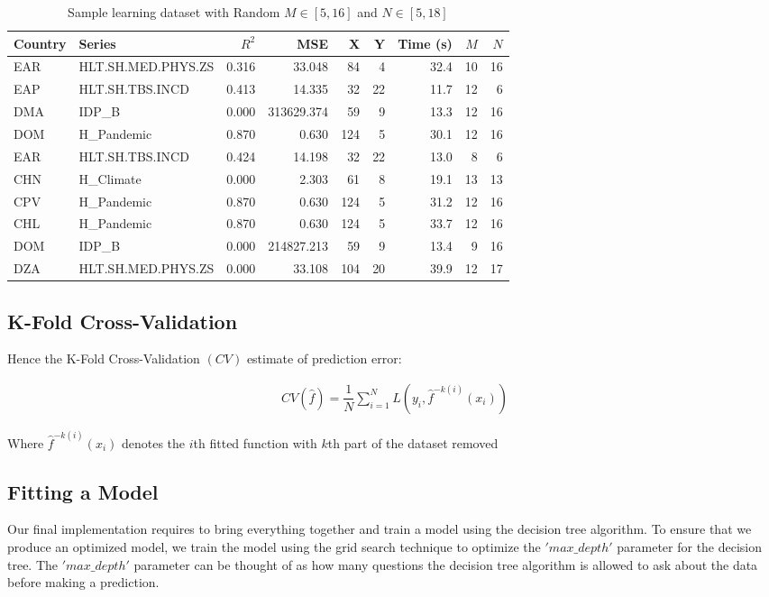 \documentclass[a4project, twocolumn]{article}
\newcommand{\Para}[1]{\left( #1 \right)}
\begin{document}
\begin{table}
  \centering
  \begin{tabular}{@{}l|l|rrrrrrr@{}}
        Country & Series & $R^2$ & MSE & X & Y & Time (s) & $M$ & $N$ \\ \hline
        EAR & HLT.SH.MED.PHYS.ZS & 0.316 & 33.048 & 84 & 4 & 32.4 & 10 & 16 \\ 
        EAP & HLT.SH.TBS.INCD & 0.413 & 14.335 & 32 & 22 & 11.7 & 12 & 6 \\ 
        DMA & IDP\_B & 0.000 & 313629.374 & 59 & 9 & 13.3 & 12 & 16 \\ 
        DOM & H\_Pandemic & 0.870 & 0.630 & 124 & 5 & 30.1 & 12 & 16 \\
        EAR & HLT.SH.TBS.INCD & 0.424 & 14.198 & 32 & 22 & 13.0 & 8 & 6 \\
        CHN & H\_Climate & 0.000 & 2.303 & 61 & 8 & 19.1 & 13 & 13 \\ 
        CPV & H\_Pandemic & 0.870 & 0.630 & 124 & 5 & 31.2 & 12 & 16 \\
        CHL & H\_Pandemic & 0.870 & 0.630 & 124 & 5 & 33.7 & 12 & 16 \\
        DOM & IDP\_B & 0.000 & 214827.213 & 59 & 9 & 13.4 & 9 & 16 \\ 
        DZA & HLT.SH.MED.PHYS.ZS & 0.000 & 33.108 & 104 & 20 & 39.9 & 12 & 17 
  \end{tabular}
  \caption{Sample learning dataset with Random $M \in [5,16]$ and $N \in [5,18]$}\label{tab:a}
\end{table}

\subsection{K-Fold Cross-Validation}
Hence the K-Fold Cross-Validation $\Para{CV}$ estimate of prediction error:

\begin{align*}
CV\Para{\hat{f}}= \dfrac{1}{N} \sum_{i=1}^{N}L\Para{y_i,\hat{f}^{-k(i)}\Para{x_i}}
\end{align*}

Where $\hat{f}^{-k(i)}\Para{x_i}$ denotes the $i$th fitted function with $k$th part of the dataset removed

\subsection{Fitting a Model}

Our final implementation requires to bring everything together and train a model using the decision tree algorithm. To ensure that we produce an optimized model, we train the model using the grid search technique to optimize the $'max\_depth'$ parameter for the decision tree. The $'max\_depth'$ parameter can be thought of as how many questions the decision tree algorithm is allowed to ask about the data before making a prediction. 
\end{document}
